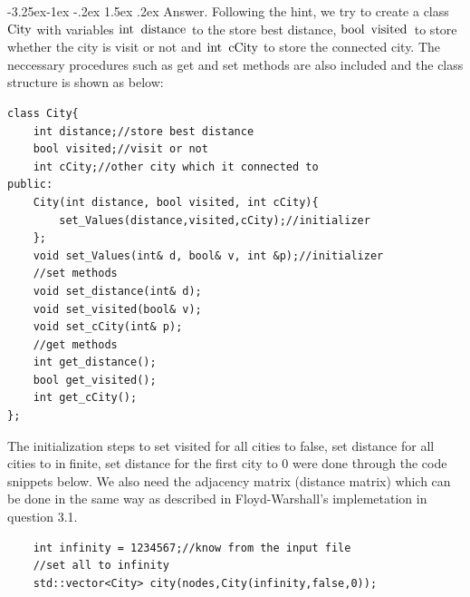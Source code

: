 \documentclass[a4paper,12pt]{article}%
\makeatletter
\renewcommand\subsubsection{\@startsection{subsection}{2}{\z@}%
                                     {-3.25ex\@plus -1ex \@minus -.2ex}%
                                     {1.5ex \@plus .2ex}%
                                     {\normalfont\bfseries\itshape}}%
\makeatother
\begin{document}
\subsubsection{Answer.}
Following the hint, we try to create a class $\lstinline{City}$ with variables $\lstinline{int distance}$ to the store best distance, $\lstinline{bool visited}$ to store whether the city is visit or not and $\lstinline{int cCity}$ to store the connected city. The neccessary procedures such as get and set methods are also included and the class structure is shown as below:
\begin{lstlisting}[title = $\lstinline{City}$]
class City{
    int distance;//store best distance
    bool visited;//visit or not
    int cCity;//other city which it connected to
public:
    City(int distance, bool visited, int cCity){
        set_Values(distance,visited,cCity);//initializer
    };
    void set_Values(int& d, bool& v, int &p);//initializer
    //set methods
    void set_distance(int& d);
    void set_visited(bool& v);
    void set_cCity(int& p);
    //get methods
    int get_distance();
    bool get_visited();
    int get_cCity();
};
\end{lstlisting}
The initialization steps to set visited for all cities to false, set distance for all cities to infinite, set distance for the first city to 0 were done through the code snippets below. We also need the adjacency matrix (distance matrix) which can be done in the same way as described in Floyd-Warshall's implemetation in question 3.1.
\begin{lstlisting}
	int infinity = 1234567;//know from the input file
    //set all to infinity
    std::vector<City> city(nodes,City(infinity,false,0)); 
\end{lstlisting}
\end{document}
